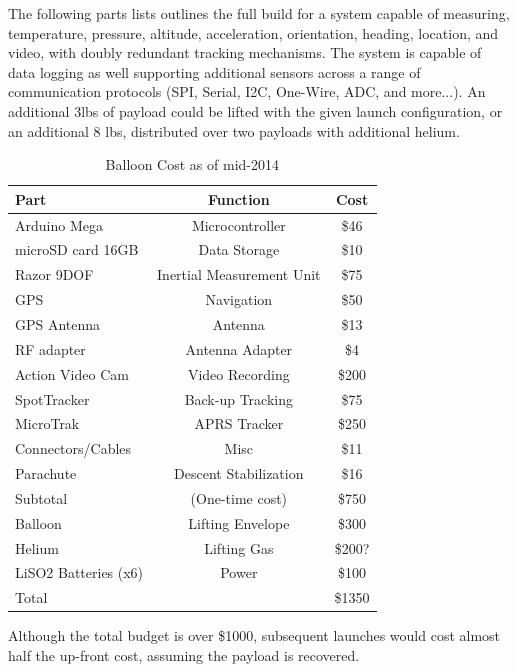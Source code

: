 \documentclass[heading.tex]{subfiles}
\begin{document}
The following parts lists outlines the full build for a system capable of
measuring, temperature, pressure, altitude, acceleration, orientation, heading,
location, and video, with doubly redundant tracking mechanisms. The system
is capable of data logging as well supporting additional sensors across a range
of communication protocols (SPI, Serial, I2C, One-Wire, ADC, and more...).
An additional 3lbs of payload could be lifted with the given launch configuration,
or an additional 8 lbs, distributed over two payloads with additional helium.

\begin{table}[h]
    \centering
    \caption{Balloon Cost as of mid-2014}
    \label{tab:desvars}
    \begin{tabular}{l  c  c } 
        \hline \hline
        Part &  Function & Cost \\ \hline \hline
        Arduino Mega & Microcontroller & \$46  \\ 
        microSD card 16GB & Data Storage & \$10 \\ 
        Razor 9DOF & Inertial Measurement Unit & \$75 \\ 
        GPS & Navigation & \$50\\
        GPS Antenna & Antenna & \$13\\
        RF adapter & Antenna Adapter & \$4\\ 
        Action Video Cam & Video Recording & \$200\\
        SpotTracker & Back-up Tracking & \$75\\ 
        MicroTrak & APRS Tracker & \$250\\ 
        Connectors/Cables & Misc & \$11\\
        Parachute & Descent Stabilization & \$16\\ \hline
        Subtotal & (One-time cost) & \$750\\ \hline
        Balloon & Lifting Envelope & \$300 \\
        Helium & Lifting Gas & \$200? \\
        LiSO2 Batteries (x6)& Power & \$100\\ \hline
        Total & & \$1350 \\ \hline \hline
    \end{tabular}
\end{table}

Although the total budget is over \$1000, subsequent launches would cost almost
half the up-front cost, assuming the payload is recovered.
\end{document}
